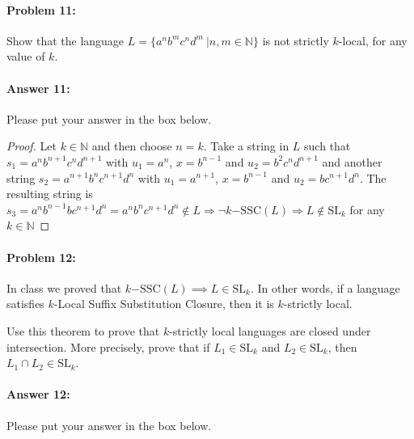 \documentclass[10pt]{article}
\newenvironment{AnswerBox}{\begin{mdframed}[style=simple]}{\end{mdframed}}
\begin{document}
\hrulefill %

\paragraph{Problem 11:}

Show that the language $L= \{a^n b^m c^n d^m\ | n, m \in \mathbb{N} \}$ is not
strictly $k$-local, for any value of $k$.

\paragraph{Answer 11:} Please put your answer in the box below.


\begin{AnswerBox}%
\begin{proof}
    Let $k \in \mathbb{N}$ and then choose $n=k$. Take a string in $L$ such that $s_1 = a^nb^{n+1}c^nd^{n+1}$ with $u_1=a^n$, $x=b^{n-1}$ and $u_2=b^2c^nd^{n+1}$ and another string $s_2 = a^{n+1}b^{n}c^{n+1}d^{n}$ with $u_1=a^{n+1}$, $x=b^{n-1}$ and $u_2=bc^{n+1}d^{n}$. The resulting string is $s_3=a^nb^{n-1}bc^{n+1}d^n = a^nb^{n}c^{n+1}d^n \notin L \Rightarrow \neg k\mathrm{-SSC}(L)  \Rightarrow L \notin \mathrm{SL}_k$ for any $k\in \mathbb{N}$ 
\end{proof}

\end{AnswerBox}%


\hrulefill %

\paragraph{Problem 12:}

In class we proved that
$k\mathrm{-SSC}(L) \implies L \in \mathrm{SL}_k$. In other words, if a
language satisfies $k$-Local Suffix Substitution Closure, then it is
$k$-strictly local.

 Use this theorem to prove that $k$-strictly local languages
are closed under intersection. More precisely, prove that if
$L_1 \in \mathrm{SL}_k$ and $L_2 \in \mathrm{SL}_k$, then
$L_1 \cap L_2 \in \mathrm{SL}_k$.

\paragraph{Answer 12:}  Please put your answer in the box below.
\end{document}
